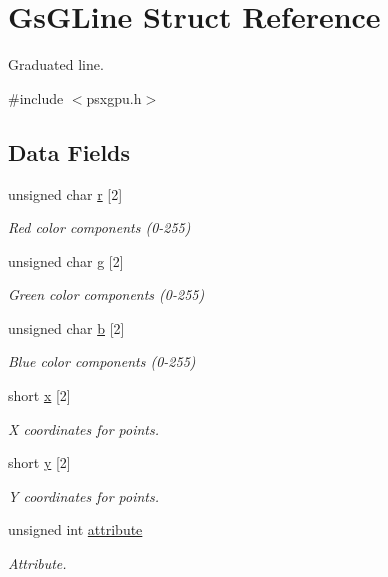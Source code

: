 \hypertarget{structGsGLine}{}\section{Gs\+G\+Line Struct Reference}
\label{structGsGLine}


Graduated line.  




{\ttfamily \#include $<$psxgpu.\+h$>$}

\subsection*{Data Fields}
\begin{DoxyCompactItemize}
\item 
unsigned char \hyperlink{structGsGLine_a769bcc099496430e50455ff903469be6}{r} \mbox{[}2\mbox{]}
\begin{DoxyCompactList}\small\item\em Red color components (0-\/255) \end{DoxyCompactList}\item 
unsigned char \hyperlink{structGsGLine_aa28614d6f820d65fe7e0146e11879f2f}{g} \mbox{[}2\mbox{]}
\begin{DoxyCompactList}\small\item\em Green color components (0-\/255) \end{DoxyCompactList}\item 
unsigned char \hyperlink{structGsGLine_a1d749e52beea52a8da21ea04e70305c6}{b} \mbox{[}2\mbox{]}
\begin{DoxyCompactList}\small\item\em Blue color components (0-\/255) \end{DoxyCompactList}\item 
short \hyperlink{structGsGLine_ad2b2ca6e5b8118612fde4c7053c0d840}{x} \mbox{[}2\mbox{]}
\begin{DoxyCompactList}\small\item\em X coordinates for points. \end{DoxyCompactList}\item 
short \hyperlink{structGsGLine_a8717aff2a54e9e287094af8717eb1dff}{y} \mbox{[}2\mbox{]}
\begin{DoxyCompactList}\small\item\em Y coordinates for points. \end{DoxyCompactList}\item 
unsigned int \hyperlink{structGsGLine_a075bc0bffec511d2f197127de13c8a0c}{attribute}
\begin{DoxyCompactList}\small\item\em Attribute. \end{DoxyCompactList}\end{DoxyCompactItemize}


